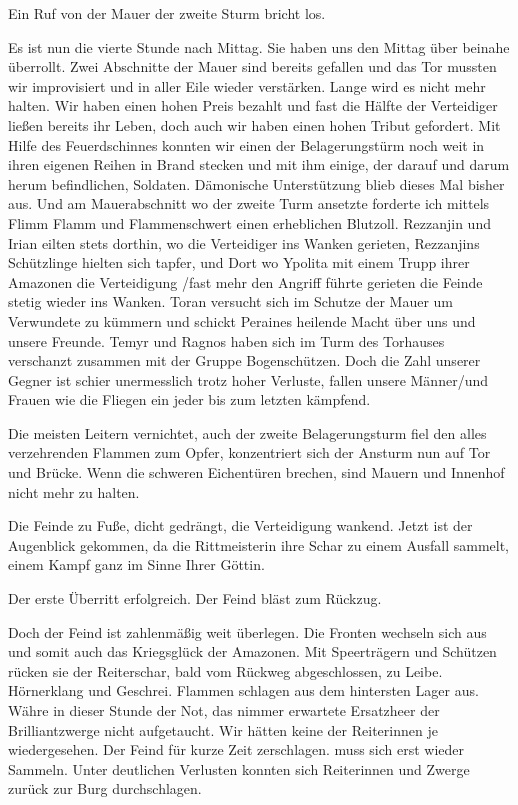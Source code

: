 Ein Ruf von der Mauer der zweite Sturm bricht los.

Es ist nun die vierte Stunde nach Mittag. Sie haben uns den Mittag über beinahe überrollt. Zwei Abschnitte der Mauer sind bereits gefallen und das Tor mussten wir improvisiert und in aller Eile wieder verstärken. Lange wird es nicht mehr halten. Wir haben einen hohen Preis bezahlt und fast die Hälfte der Verteidiger ließen bereits ihr Leben, doch auch wir haben einen hohen Tribut gefordert. Mit Hilfe des Feuerdschinnes konnten wir einen der Belagerungstürm noch weit in ihren eigenen Reihen in Brand stecken und mit ihm einige, der darauf und darum herum befindlichen, Soldaten. Dämonische Unterstützung blieb dieses Mal bisher aus. Und am Mauerabschnitt wo der zweite Turm ansetzte forderte ich mittels Flimm Flamm und Flammenschwert einen erheblichen Blutzoll. Rezzanjin und Irian eilten stets dorthin, wo die Verteidiger ins Wanken gerieten, Rezzanjins Schützlinge hielten sich tapfer, und Dort wo Ypolita mit einem Trupp ihrer Amazonen die Verteidigung /fast mehr den Angriff führte gerieten die Feinde stetig wieder ins Wanken. Toran versucht sich im Schutze der Mauer um Verwundete zu kümmern und schickt Peraines heilende Macht über uns und unsere Freunde. Temyr und Ragnos haben sich im Turm des Torhauses verschanzt zusammen mit der Gruppe Bogenschützen. Doch die Zahl unserer Gegner ist schier unermesslich trotz hoher Verluste, fallen unsere Männer/und Frauen wie die Fliegen ein jeder bis zum letzten kämpfend.

Die meisten Leitern vernichtet, auch der zweite Belagerungsturm fiel den alles verzehrenden Flammen zum Opfer, konzentriert sich der Ansturm nun auf Tor und Brücke. Wenn die schweren Eichentüren brechen, sind Mauern und Innenhof nicht mehr zu halten.

Die Feinde zu Fuße, dicht gedrängt, die Verteidigung wankend. Jetzt ist der Augenblick gekommen, da die Rittmeisterin ihre Schar zu einem Ausfall sammelt, einem Kampf ganz im Sinne Ihrer Göttin.

Der erste Überritt erfolgreich. Der Feind bläst zum Rückzug.

Doch der Feind ist zahlenmäßig weit überlegen. Die Fronten wechseln sich aus und somit auch das Kriegsglück der Amazonen. Mit Speerträgern und Schützen rücken sie der Reiterschar, bald vom Rückweg abgeschlossen, zu Leibe. Hörnerklang und Geschrei. Flammen schlagen aus dem hintersten Lager aus. Währe in dieser Stunde der Not, das nimmer erwartete Ersatzheer der Brilliantzwerge nicht aufgetaucht. Wir hätten keine der Reiterinnen je wiedergesehen. Der Feind für kurze Zeit zerschlagen. muss sich erst wieder Sammeln. Unter deutlichen Verlusten konnten sich Reiterinnen und Zwerge zurück zur Burg durchschlagen.

